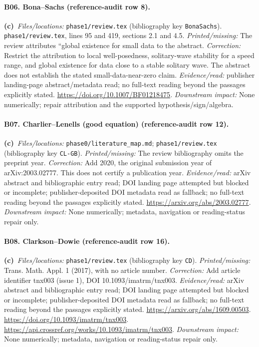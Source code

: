 \documentclass[11pt,a4paper]{article}
\newcommand{\C}{\textbf{(c)}\ }
\newcommand{\file}[1]{\nolinkurl{#1}}
\begin{document}
\paragraph{B06. Bona--Sachs (reference-audit row 8).}
\C \textit{Files/locations:} \file{phase1/review.tex} (bibliography key \file{BonaSachs}).
\file{phase1/review.tex}, lines 95 and 419, sections 2.1 and 4.5.
\textit{Printed/missing:} The review attributes ``global existence for small data to the abstract.
\textit{Correction:} Restrict the attribution to local well-posedness, solitary-wave stability for a speed range, and global existence for data close to a stable solitary wave. The abstract does not establish the stated small-data-near-zero claim.
\textit{Evidence/read:} publisher landing-page abstract/metadata read; no full-text reading beyond the passages explicitly stated.
\url{https://doi.org/10.1007/BF01218475}.
\textit{Downstream impact:} None numerically; repair attribution and the supported hypothesis/sign/algebra.
\paragraph{B07. Charlier--Lenells (good equation) (reference-audit row 12).}
\C \textit{Files/locations:} \file{phase0/literature_map.md}; \file{phase1/review.tex} (bibliography key \file{CL-GB}).
\textit{Printed/missing:} The review bibliography omits the preprint year.
\textit{Correction:} Add 2020, the original submission year of arXiv:2003.02777. This does not certify a publication year.
\textit{Evidence/read:} arXiv abstract and bibliographic entry read; DOI landing page attempted but blocked or incomplete; publisher-deposited DOI metadata read as fallback; no full-text reading beyond the passages explicitly stated.
\url{https://arxiv.org/abs/2003.02777}.
\textit{Downstream impact:} None numerically; metadata, navigation or reading-status repair only.
\paragraph{B08. Clarkson--Dowie (reference-audit row 16).}
\C \textit{Files/locations:} \file{phase1/review.tex} (bibliography key \file{CD}).
\textit{Printed/missing:} Trans. Math. Appl. 1 (2017), with no article number.
\textit{Correction:} Add article identifier tnx003 (issue 1), DOI 10.1093/imatrm/tnx003.
\textit{Evidence/read:} arXiv abstract and bibliographic entry read; DOI landing page attempted but blocked or incomplete; publisher-deposited DOI metadata read as fallback; no full-text reading beyond the passages explicitly stated.
\url{https://arxiv.org/abs/1609.00503}.
\url{https://doi.org/10.1093/imatrm/tnx003}.
\url{https://api.crossref.org/works/10.1093/imatrm/tnx003}.
\textit{Downstream impact:} None numerically; metadata, navigation or reading-status repair only.
\end{document}
